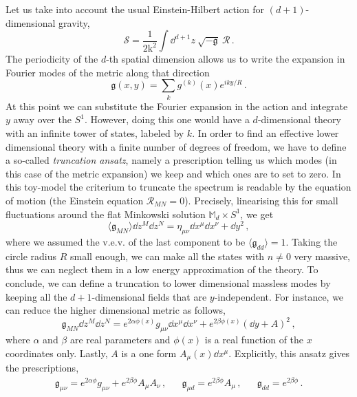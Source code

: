 \documentclass[draft]{phd}
\begin{document}
			Let us take into account the usual Einstein-Hilbert action for $(d+1)$-dimensional gravity,
					\begin{equation*}
						\mathcal{S} = \frac{1}{2 \mathrm{k}^2} \int \dd^{d+1}z\ \sqrt{-\mathfrak{g}}\ \mathcal{R} \, .
					\end{equation*}
			The periodicity of the $d$-th spatial dimension allows us to write the expansion in Fourier modes of the metric along that direction
					\begin{equation*}
						\mathfrak{g} (x, y) = \sum_{k} g^{(k)}(x) e^{i k y / R} \, .
					\end{equation*}
			At this point we can substitute the Fourier expansion in the action and integrate $y$ away over the $S^1$.
			However, doing this one would have a $d$-dimensional theory with an infinite tower of states, labeled by $k$.
			In order to find an effective lower dimensional theory with a finite number of degrees of freedom, we have to define a so-called \emph{truncation ansatz}, namely a prescription telling us which modes (in this case of the metric expansion) we keep and which ones are to set to zero.
			In this toy-model the criterium to truncate the spectrum is readable by the equation of motion (the Einstein equation $\mathcal{R}_{MN} = 0$).
			Precisely, linearising this for small fluctuations around the flat Minkowski solution $\mathbb{M}_{d} \times S^1$, we get
					\begin{equation*}
						\langle \mathfrak{g}_{MN} \rangle \dd z^M \dd z^N = \eta_{\mu\nu} \dd x^\mu \dd x^\nu + \dd y^2 \, , 
					\end{equation*}
			where we assumed the v.e.v. of the last component to be $\langle \mathfrak{g}_{dd} \rangle = 1$.
			Taking the circle radius $R$ small enough, we can make all the states with $n\neq 0$ very massive, thus we can neglect them in a low energy approximation of the theory.
			To conclude, we can define a truncation to lower dimensional massless modes by keeping all the $d+1$-dimensional fields that are $y$-independent.
			For instance, we can reduce the higher dimensional metric as follows,
					\begin{equation*}
						\mathfrak{g}_{MN} \dd z^M \dd z^N =  e^{2\alpha \phi(x)} g_{\mu\nu} \dd x^\mu \dd x^\nu + e^{2\beta \phi(x)} (\dd y + A )^2\, ,
					\end{equation*}
			where $\alpha$ and $\beta$ are real parameters and $\phi(x)$ is a real function of the $x$ coordinates only. 
			Lastly, $A$ is a one form $A_{\mu}(x) \dd x^\mu$.
			Explicitly, this ansatz gives the prescriptions,
					\begin{align*}
						&& \mathfrak{g}_{\mu\nu} = e^{2\alpha \phi} g_{\mu\nu} + e^{2\beta \phi} A_{\mu} A_{\nu} \, , && \mathfrak{g}_{\mu d} = e^{2\beta \phi} A_{\mu} \, , & & \mathfrak{g}_{dd} = e^{2\beta\phi} \, . & &
					\end{align*}
			
\end{document}
